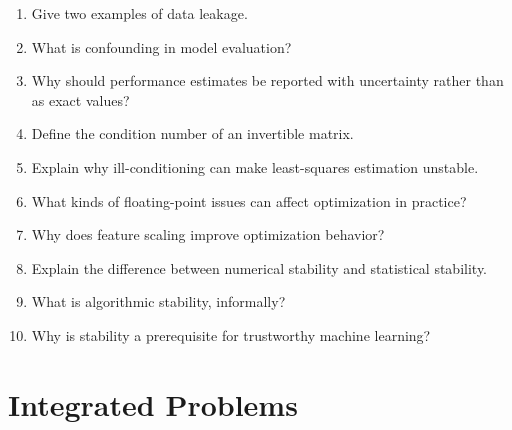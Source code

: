 \begin{enumerate}
    \item Give two examples of data leakage.

    \item What is confounding in model evaluation?

    \item Why should performance estimates be reported with uncertainty rather than as exact values?

    \item Define the condition number of an invertible matrix.

    \item Explain why ill-conditioning can make least-squares estimation unstable.

    \item What kinds of floating-point issues can affect optimization in practice?

    \item Why does feature scaling improve optimization behavior?

    \item Explain the difference between numerical stability and statistical stability.

    \item What is algorithmic stability, informally?

    \item Why is stability a prerequisite for trustworthy machine learning?
\end{enumerate}

\section*{Integrated Problems}

